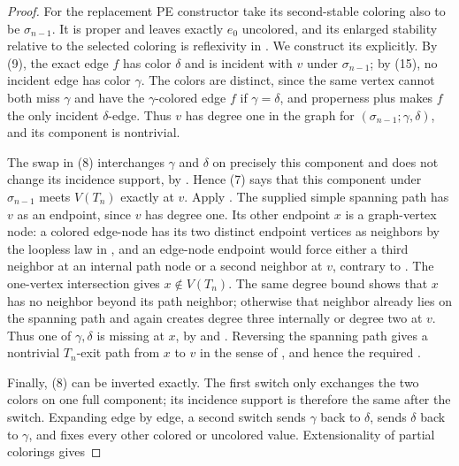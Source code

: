\begin{proof}
For the replacement PE constructor take its second-stable coloring also
to be \(\sigma_{n-1}\).  It is proper and leaves exactly \(e_0\)
uncolored, and its enlarged stability relative to the selected coloring
is reflexivity in .  We construct its
 explicitly.  By (9), the exact edge \(f\) has color
\(\delta\) and is incident with \(v\) under \(\sigma_{n-1}\); by
(15), no incident edge has color \(\gamma\).  The colors are distinct,
since the same vertex cannot both miss \(\gamma\) and have the
\(\gamma\)-colored edge \(f\) if \(\gamma=\delta\),
and properness plus  makes \(f\) the only incident
\(\delta\)-edge.  Thus \(v\) has degree one in the graph
 for
\((\sigma_{n-1};\gamma,\delta)\), and its component is nontrivial.

The swap in (8) interchanges \(\gamma\) and \(\delta\) on precisely this
component and does not change its incidence support, by
.  Hence (7) says that this component
under \(\sigma_{n-1}\) meets \(V(T_n)\) exactly at \(v\).  Apply
.  The supplied simple spanning
path has \(v\) as an endpoint, since \(v\) has degree one.  Its other
endpoint \(x\) is a graph-vertex node: a colored edge-node has its two
distinct endpoint vertices as neighbors by the loopless law in
, and an edge-node endpoint would
force either a third neighbor at an internal path node or a second neighbor
at \(v\), contrary to .  The
one-vertex intersection gives \(x\notin V(T_n)\).  The same degree bound
shows that \(x\) has no neighbor beyond its path neighbor; otherwise that
neighbor already lies on the spanning path and again creates degree three
internally or degree two at \(v\).  Thus one of \(\gamma,\delta\) is
missing at \(x\), by  and
.  Reversing the spanning path gives a nontrivial
\(T_n\)-exit path from \(x\) to \(v\) in the sense of
, and hence the required .

Finally, (8) can be inverted exactly.  The first switch only exchanges
the two colors on one full component; its incidence support is therefore
the same after the switch.  Expanding 
edge by edge, a second switch sends \(\gamma\) back to \(\delta\), sends
\(\delta\) back to \(\gamma\), and fixes every other colored or uncolored
value.  Extensionality of partial colorings gives


\end{proof}
